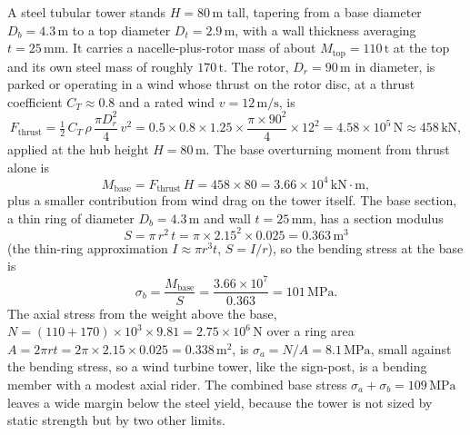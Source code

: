 A steel tubular tower stands $H = 80\,\si{\meter}$ tall, tapering from a
base diameter $D_b = 4.3\,\si{\meter}$ to a top diameter $D_t =
2.9\,\si{\meter}$, with a wall thickness averaging $t = 25\,\si{\milli
\meter}$. It carries a nacelle-plus-rotor mass of about $M_{\text{top}} =
110\,\si{\tonne}$ at the top and its own steel mass of roughly
$170\,\si{\tonne}$. The rotor, $D_r = 90\,\si{\meter}$ in diameter, is
parked or operating in a wind whose thrust on the rotor disc, at a
thrust coefficient $C_T \approx 0.8$ and a rated wind $v = 12\,\si{\meter
\per\second}$, is
\[
F_{\text{thrust}} = \tfrac12\,C_T\,\rho\,\frac{\pi D_r^2}{4}\,v^2
= 0.5 \times 0.8 \times 1.25 \times \frac{\pi \times 90^2}{4}
\times 12^2
= 4.58 \times 10^5\,\text{N} \approx 458\,\text{kN},
\]
applied at the hub height $H = 80\,\si{\meter}$. The base overturning
moment from thrust alone is
\[
M_{\text{base}} = F_{\text{thrust}}\,H = 458 \times 80
= 3.66 \times 10^4\,\text{kN}\cdot\text{m},
\]
plus a smaller contribution from wind drag on the tower itself. The base
section, a thin ring of diameter $D_b = 4.3\,\si{\meter}$ and wall $t =
25\,\si{\milli\meter}$, has a section modulus
\[
S = \pi\,r^2\,t = \pi \times 2.15^2 \times 0.025
= 0.363\,\si{\meter\cubed}
\]
(the thin-ring approximation $I \approx \pi r^3 t$, $S = I/r$), so the
bending stress at the base is
\[
\sigma_b = \frac{M_{\text{base}}}{S}
= \frac{3.66 \times 10^7}{0.363} = 101\,\text{MPa}.
\]
The axial stress from the weight above the base, $N = (110 + 170)\times
10^3 \times 9.81 = 2.75 \times 10^6\,\text{N}$ over a ring area $A =
2\pi r t = 2\pi \times 2.15 \times 0.025 = 0.338\,\si{\meter\squared}$,
is $\sigma_a = N/A = 8.1\,\text{MPa}$, small against the bending stress,
so a wind turbine tower, like the sign-post, is a bending member with a
modest axial rider. The combined base stress $\sigma_a + \sigma_b =
109\,\text{MPa}$ leaves a wide margin below the steel yield, because the
tower is not sized by static strength but by two other limits.

